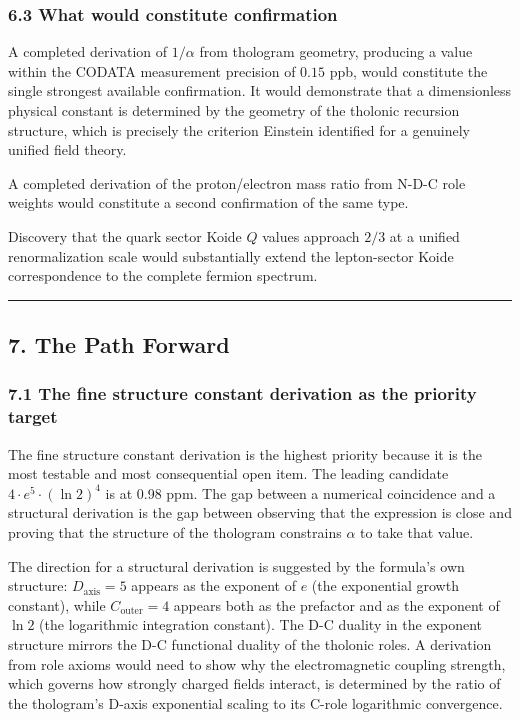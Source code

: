 \documentclass[
  11pt,
  letterpaper,
]{article}
\begin{document}
\subsubsection{6.3 What would constitute
confirmation}\label{what-would-constitute-confirmation}

A completed derivation of \(1/\alpha\) from thologram geometry,
producing a value within the CODATA measurement precision of \(0.15\)
ppb, would constitute the single strongest available confirmation. It
would demonstrate that a dimensionless physical constant is determined
by the geometry of the tholonic recursion structure, which is precisely
the criterion Einstein identified for a genuinely unified field theory.

A completed derivation of the proton/electron mass ratio from N-D-C role
weights would constitute a second confirmation of the same type.

Discovery that the quark sector Koide \(Q\) values approach \(2/3\) at a
unified renormalization scale would substantially extend the
lepton-sector Koide correspondence to the complete fermion spectrum.

\begin{center}\rule{0.5\linewidth}{0.5pt}\end{center}

\subsection{7. The Path Forward}\label{the-path-forward}

\subsubsection{7.1 The fine structure constant derivation as the
priority
target}\label{the-fine-structure-constant-derivation-as-the-priority-target}

The fine structure constant derivation is the highest priority because
it is the most testable and most consequential open item. The leading
candidate \(4 \cdot e^5 \cdot (\ln 2)^4\) is at 0.98 ppm. The gap
between a numerical coincidence and a structural derivation is the gap
between observing that the expression is close and proving that the
structure of the thologram constrains \(\alpha\) to take that value.

The direction for a structural derivation is suggested by the formula's
own structure: \(D_{\text{axis}} = 5\) appears as the exponent of \(e\)
(the exponential growth constant), while \(C_{\text{outer}} = 4\)
appears both as the prefactor and as the exponent of \(\ln 2\) (the
logarithmic integration constant). The D-C duality in the exponent
structure mirrors the D-C functional duality of the tholonic roles. A
derivation from role axioms would need to show why the electromagnetic
coupling strength, which governs how strongly charged fields interact,
is determined by the ratio of the thologram's D-axis exponential scaling
to its C-role logarithmic convergence.
\end{document}
